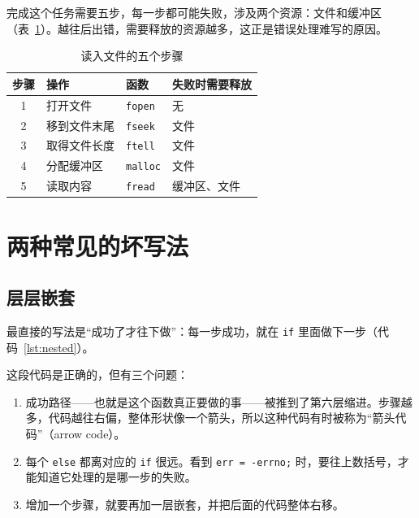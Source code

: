 完成这个任务需要五步，每一步都可能失败，涉及两个资源：文件和缓冲区（表~\ref{tab:load-steps}）。越往后出错，需要释放的资源越多，这正是错误处理难写的原因。

\begin{table}[htbp]
  \begin{lazywide}
  \caption{读入文件的五个步骤}
  \label{tab:load-steps}
  \begin{tabular}{clll}
    \toprule
    步骤 & 操作 & 函数 & 失败时需要释放 \\
    \midrule
    1 & 打开文件     & \texttt{fopen}  & 无 \\
    2 & 移到文件末尾 & \texttt{fseek}  & 文件 \\
    3 & 取得文件长度 & \texttt{ftell}  & 文件 \\
    4 & 分配缓冲区   & \texttt{malloc} & 文件 \\
    5 & 读取内容     & \texttt{fread}  & 缓冲区、文件 \\
    \bottomrule
  \end{tabular}
  \end{lazywide}
\end{table}

\section{两种常见的坏写法}

\subsection{层层嵌套}

最直接的写法是“成功了才往下做”：每一步成功，就在 \texttt{if} 里面做下一步（代码~\ref{lst:nested}）。


这段代码是正确的，但有三个问题：
\begin{enumerate}
  \item 成功路径——也就是这个函数真正要做的事——被推到了第六层缩进。步骤越多，代码越往右偏，整体形状像一个箭头，所以这种代码有时被称为“箭头代码”（arrow code）。
  \item 每个 \texttt{else} 都离对应的 \texttt{if} 很远。看到 \texttt{err = -errno;} 时，要往上数括号，才能知道它处理的是哪一步的失败。
  \item 增加一个步骤，就要再加一层嵌套，并把后面的代码整体右移。
\end{enumerate}

